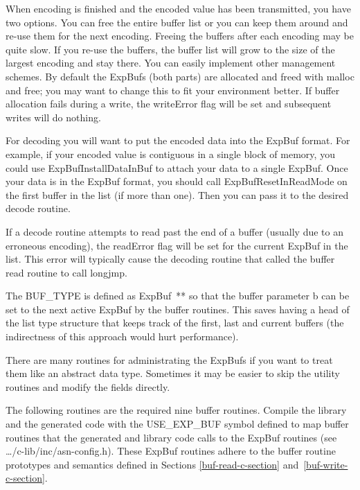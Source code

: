 When encoding is finished and the encoded value has been transmitted,
you have two options.   You can free the entire buffer list or you can
keep them around and re-use them for the next encoding.  Freeing the
buffers after each encoding may be quite slow.  If you re-use the
buffers, the buffer list will grow to the size of the largest encoding
and stay there.  You can easily implement other management schemes.
By default the {\C ExpBuf}s (both parts) are allocated and freed with
{\C malloc} and {\C free}; you may want to change this to fit your
environment better. If buffer allocation fails during a write, the
writeError flag will be set and subsequent writes will do nothing.

For decoding you will want to put the encoded data into the
{\C ExpBuf} format.   For example, if your encoded value is
contiguous in a single block of memory, you could use
{\C ExpBufInstallDataInBuf} to attach your data to a single ExpBuf.
Once your data is in the ExpBuf format, you should call
{\C ExpBufResetInReadMode} on the first buffer in the list (if more
than one).  Then you can pass it to the desired decode routine.

If a decode routine attempts to read past the end of a buffer (usually
due to an erroneous encoding), the readError flag will be set for the
current {\C ExpBuf} in the list.  This error will typically cause
the decoding routine that called the buffer read routine to call
{\C longjmp}.

The {\C BUF\_TYPE} is defined as {\C ExpBuf~**} so that the buffer
parameter {\C b} can be set to the next active {\C ExpBuf} by the
buffer routines.  This saves having a head of the list type structure
that keeps track of the first, last and current buffers (the
indirectness of this approach would hurt performance).

There are many routines for administrating the {\C ExpBufs} if you
want to treat them like an abstract data type.  Sometimes it may be
easier to skip the utility routines and modify the fields directly.

The following routines are the required nine buffer routines.  Compile
the library and the generated code with the {\C USE\_EXP\_BUF} symbol
defined to map buffer routines that the generated and library code
calls to the {\C ExpBuf} routines (see
{\ufn \dots/c-lib/inc/asn-config.h}). These {\C ExpBuf} routines
adhere to the buffer routine prototypes and semantics defined in
Sections \ref{buf-read-c-section} and~\ref{buf-write-c-section}.

